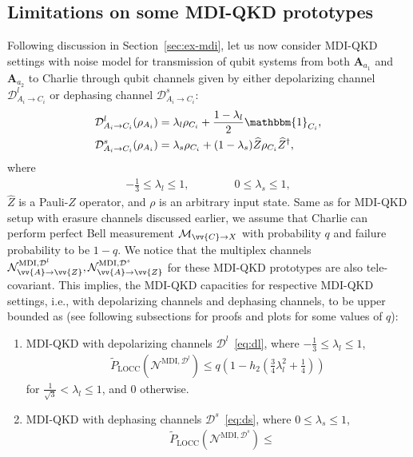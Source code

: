 \documentclass[aps,pra,twocolumn,superscriptaddress,longbibliography]{revtex4-1}
\def\LOCC{\operatorname{LOCC}}
\newcommand{\mc}[1]{\mathcal{#1}}
\newcommand{\bbm}[1]{\mathbbm{#1}}
\begin{document}
\begin{appendix}
\section{Limitations on some MDI-QKD prototypes}\label{app:mdiqkd}
Following discussion in Section~\ref{sec:ex-mdi}, let us now consider MDI-QKD settings with noise model for transmission of qubit systems from both $\textbf{A}_{a_1}$ and $\textbf{A}_{a_2}$ to Charlie through qubit channels given by either depolarizing channel $\mc{D}^{l}_{A_i\to C_i}$ or dephasing channel $\mc{D}^s_{A_i\to C_i}$:
\begin{align}
   \mc{D}^l_{A_i\to C_i}(\rho_{A_i}) &= \lambda_{l}\rho_{C_i}+\frac{1-\lambda_l}{2}\bbm{1}_{C_i},\label{eq:ds}\\
    \mc{D}^s_{A_i\to C_i}(\rho_{A_i}) &= \lambda_{s}\rho_{C_i}+(1-\lambda_s)\widehat{Z}\rho_{C_i}\widehat{Z}^\dag,\label{eq:dl}
\end{align}
where 
\begin{align}
-\frac{1}{3}\leq \lambda_l\leq 1,\qquad\qquad 0\leq\lambda_s\leq 1,
\end{align} 
$\widehat{Z}$ is a Pauli-$Z$ operator, and $\rho$ is an arbitrary input state. Same as for MDI-QKD setup with erasure channels discussed earlier, we assume that Charlie can perform perfect Bell measurement $\mc{M}_{\vv{C}\to X}$ with probability $q$ and failure probability to be $1-q$. We notice that the multiplex channels $\mc{N}^{\text{MDI},\mc{D}^{l}}_{\vv{A}\to\vv{Z}}, \mc{N}^{\text{MDI},\mc{D}^{s}}_{\vv{A}\to\vv{Z}}$ for these MDI-QKD prototypes are also tele-covariant. This implies, the MDI-QKD capacities for respective MDI-QKD settings, i.e., with depolarizing channels and dephasing channels, to be upper bounded as (see following subsections for proofs and plots for some values of $q$):
\begin{enumerate}
    \item MDI-QKD with depolarizing channels $\mc{D}^{l}$~\eqref{eq:dl}, where $-\frac{1}{3}\leq \lambda_l\leq 1$, 
    \begin{align}\label{eq:mdi-dl}
        \widetilde{P}_{\LOCC}(\mc{N}^{\text{MDI},\mc{D}^{l}})\leq q\left(1-h_2\left(\frac{3}{4}\lambda_l^2+\frac{1}{4}\right)\right)
    \end{align}
    for $\frac{1}{\sqrt{3}}<\lambda_l\leq 1$, and $0$ otherwise.
    \item MDI-QKD with dephasing channels $\mc{D}^s$~\eqref{eq:ds}, where $0\leq\lambda_s\leq 1$,
      \begin{align}\label{eq:MDI-ds}
   & \widetilde{P}_{\LOCC}(\mc{N}^{\text{MDI},\mc{D}^{s}})\leq \nonumber\\

\end{align}
\end{enumerate}
\end{appendix}
\end{document}
